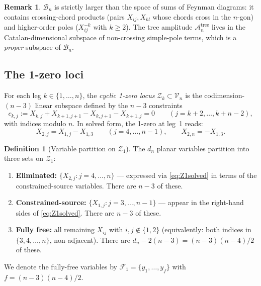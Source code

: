 \documentclass[11pt]{article}
\theoremstyle{plain}
\theoremstyle{definition}
\newtheorem{definition}[theorem]{Definition}
\newtheorem{remark}[theorem]{Remark}
\newcommand{\cA}{\mathcal{A}}
\newcommand{\cB}{\mathcal{B}}
\newcommand{\cV}{\mathcal{V}}
\newcommand{\cZ}{\mathcal{Z}}
\newcommand{\cF}{\mathcal{F}}
\begin{document}
\begin{remark}
$\cB_n$ is strictly larger than the space of sums of Feynman diagrams:
it contains crossing-chord products (pairs $X_{ij}, X_{kl}$ whose
chords cross in the $n$-gon) and higher-order poles ($X_{ij}^{-k}$
with $k\geq 2$). The tree amplitude $\cA_n^{\mathrm{tree}}$ lives in
the Catalan-dimensional subspace of non-crossing simple-pole terms,
which is a \emph{proper} subspace of $\cB_n$.
\end{remark}

\subsection{The 1-zero loci}

For each leg $k\in\{1,\ldots,n\}$, the \emph{cyclic 1-zero locus}
$\cZ_k\subset\cV_n$ is the codimension-$(n{-}3)$ linear subspace
defined by the $n{-}3$ constraints
\begin{equation}
c_{k,j} := X_{k,j}+X_{k+1,j+1}-X_{k,j+1}-X_{k+1,j} = 0
\qquad (j = k{+}2,\ldots,k{+}n{-}2),
\label{eq:1zero}
\end{equation}
with indices modulo $n$. In solved form, the 1-zero at leg~1 reads:
\begin{equation}
X_{2,j} = X_{1,j} - X_{1,3}\qquad (j=4,\ldots,n{-}1),
\qquad X_{2,n} = -X_{1,3}.
\label{eq:Z1solved}
\end{equation}

\begin{definition}[Variable partition on $\cZ_1$]\label{def:partition}
The $d_n$ planar variables partition into three sets on $\cZ_1$:
\begin{enumerate}[label=(\alph*),nosep]
\item \textbf{Eliminated:} $\{X_{2,j}: j=4,\ldots,n\}$ --- expressed
      via \eqref{eq:Z1solved} in terms of the constrained-source variables.
      There are $n{-}3$ of these.
\item \textbf{Constrained-source:} $\{X_{1,j}: j=3,\ldots,n{-}1\}$
      --- appear in the right-hand sides of \eqref{eq:Z1solved}.
      There are $n{-}3$ of these.
\item \textbf{Fully free:} all remaining $X_{ij}$ with
      $i,j\notin\{1,2\}$ (equivalently: both indices in
      $\{3,4,\ldots,n\}$, non-adjacent). There are
      $d_n - 2(n{-}3) = (n{-}3)(n{-}4)/2$ of these.
\end{enumerate}
We denote the fully-free variables by $\cF_1 = \{y_1,\ldots,y_f\}$
with $f = (n{-}3)(n{-}4)/2$.
\end{definition}
\end{document}
